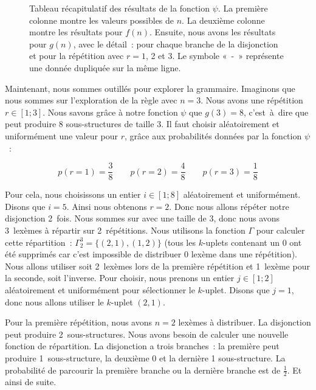 \begin{example}
\begin{figure}
\caption{\label{figure:data:random_tabular} Tableau récapitulatif des résultats
de la fonction $\psi$. La première colonne montre les valeurs possibles de $n$.
La deuxième colonne montre les résultats pour $f(n)$. Ensuite, nous avons les
résultats pour $g(n)$, avec le détail~: pour chaque branche de la disjonction et
pour la répétition avec $r = 1$, 2 et 3. Le symbole «~-~» représente une donnée
dupliquée sur la même ligne.}

\end{figure}

Maintenant, nous sommes outillés pour explorer la grammaire. Imaginons que nous
sommes sur l'exploration de la règle  avec $n = 3$. Nous avons une
répétition $r \in [1; 3]$. Nous savons grâce à notre fonction $\psi$ que $g(3) =
8$, c'est~à~dire que  peut produire 8 sous-structures de taille 3. Il
faut choisir aléatoirement et uniformément une valeur pour $r$, grâce aux
probabilités données par la fonction $\psi$~:

$$
p(r = 1) = \frac{3}{8} \qquad
p(r = 2) = \frac{4}{8} \qquad
p(r = 3) = \frac{1}{8}
$$

Pour cela, nous choisissons un entier $i \in [1; 8]$ aléatoirement et
uniformément. Disons que $i = 5$. Ainsi nous obtenons $r = 2$.
%
%
%
%
%
%
%
%
Donc nous allons répéter notre disjonction 2~fois. Nous sommes sur  avec
une taille de 3, donc nous avons 3~lexèmes à répartir sur 2~répétitions. Nous
utilisons la fonction $\Gamma$ pour calculer cette répartition~: $\Gamma_2^3 =
\{(2, 1), (1, 2)\}$ (tous les $k$-uplets contenant un 0 ont été supprimés car
c'est impossible de distribuer 0 lexème dans une répétition). Nous allons
utiliser soit 2~lexèmes lors de la première répétition et 1~lexème pour la
seconde, soit l'inverse. Pour choisir, nous prenons un entier $j \in [1; 2]$
aléatoirement et uniformément pour sélectionner le $k$-uplet. Disons que $j =
1$, donc nous allons utiliser le $k$-uplet $(2, 1)$.

Pour la première répétition, nous avons $n = 2$ lexèmes à distribuer. La
disjonction peut produire 2~sous-structures. Nous avons besoin de calculer une
nouvelle fonction de répartition. La disjonction a trois branches~: la première
peut produire 1~sous-structure, la deuxième 0 et la dernière 1 sous-structure.
La probabilité de parcourir la première branche ou la dernière branche est de
$\tfrac{1}{2}$. Et ainsi de suite.

\end{example}

